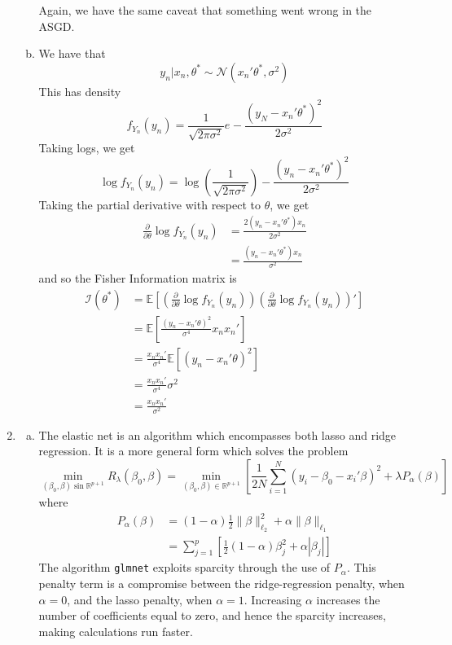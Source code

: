\documentclass[letterpaper,10pt]{amsart}
\newcommand{\E}[1]{\mathbb{E}\!\left[#1\right]}
\newcommand{\sI}{\mathcal{I}}
\newcommand{\sR}{\mathbb{R}}
\begin{document}
\begin{enumerate}[1.]
\begin{enumerate}[(a)]
\begin{center}
\end{center}
Again, we have the same caveat that something went wrong in the ASGD.

\item
We have that 
\[y_n | x_n, \theta^* \sim \mathcal{N}(x_n' \theta^*, \sigma^2)\]
This has density
\[f_{Y_n}(y_n) = \frac{1}{\sqrt{2 \pi \sigma^2}}e^{}-\frac{(y_N - x_n'\theta^*)^2}{2\sigma^2}\]
Taking logs, we get
\[\log f_{Y_n}(y_n) = \log\left(\frac{1}{\sqrt{2 \pi \sigma^2}}\right) - \frac{(y_n - x_n' \theta^*)^2}{2\sigma^2}  \]
Taking the partial derivative with respect to $\theta$, we get
\begin{align*}
\frac{\partial}{\partial \theta} \log f_{Y_n}(y_n) &= \frac{2(y_n - x_n' \theta^*)x_n}{2 \sigma^2}\\
&= \frac{(y_n - x_n' \theta^*) x_n}{\sigma^2}
\end{align*}
and so the Fisher Information matrix is
\begin{align*}
\sI(\theta^*) &= \E{\left(\frac{\partial}{\partial \theta} \log f_{Y_n}(y_n)\right)\left(\frac{\partial}{\partial \theta} \log f_{Y_n}(y_n)\right)'}\\
&= \E{\frac{(y_n - x_n' \theta)^2}{\sigma^4} x_n x_n'}\\
&= \frac{x_n x_n' }{\sigma^4} \E{(y_n - x_n' \theta)^2}\\
&= \frac{x_n x_n' }{\sigma^4} \sigma^2\\
&= \frac{x_n x_n'}{\sigma^2}
\end{align*}
\end{enumerate}


\item
\begin{enumerate}[(a)]
\item
The elastic net is an algorithm which encompasses both lasso and ridge regression. It is a more general form which solves the problem 
\[\min_{(\beta_0,\beta) \sin \sR^{p+1}} R_\lambda (\beta_0, \beta) = \min_{(\beta_0, \beta) \in \sR^{p+1}} \left[\frac{1}{2N}\sum_{i=1}^N (y_i - \beta_0 - x_i' \beta)^2 + \lambda P_{\alpha}(\beta)\right]\] 
where
\begin{align*}
P_{\alpha}(\beta) &= (1-\alpha)\frac{1}{2}\|\beta\|_{\ell_2}^2 + \alpha \|\beta\|_{\ell_1}\\
&= \sum_{j=1}^p \left[\frac{1}{2}(1-\alpha)\beta_j^2 + \alpha | \beta_j|\right]
\end{align*}
The algorithm \texttt{glmnet} exploits sparcity through the use of $P_\alpha$. This penalty term is a compromise between the ridge-regression penalty, when $\alpha=0$, and the lasso penalty, when $\alpha=1$. Increasing $\alpha$ increases the number of coefficients equal to zero, and hence the sparcity increases, making calculations run faster.


\end{enumerate}
\end{enumerate}
\end{document}
